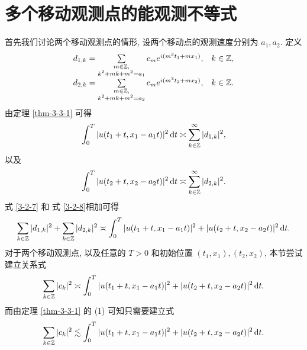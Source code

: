     \section{多个移动观测点的能观测不等式}
    首先我们讨论两个移动观测点的情形, 设两个移动点的观测速度分别为 $a_1,a_2$.
    定义
    \begin{equation*}
        \begin{array}{ll}
                        d_{1,k}=\sum\limits_{\substack{
                m\in \mathbb{Z},  \\
                k^2+mk+m^2 = a_1 }} 
             c_me^{i(m^3t_1+mx_1)}, & k\in \mathbb{Z}, \\
                        d_{2,k}=\sum\limits_{\substack{
                m\in \mathbb{Z},  \\
                k^2+mk+m^2 = a_2 }} 
             c_me^{i(m^3t_2+mx_2)}, & k\in \mathbb{Z}. 
        \end{array}
    \end{equation*}
    由定理 \ref{thm-3-3-1} 可得
\begin{equation}\label{3-2-7}
    \int_0^T |u(t_1+t,x_1-a_1t)|^2\,\mathrm{d} t\asymp \sum_{k\in\mathbb{Z}}^\infty|d_{1,k}|^2,
\end{equation}
以及
\begin{equation}\label{3-2-8}
    \int_0^T |u(t_2+t,x_2-a_2t)|^2\,\mathrm{d} t\asymp \sum_{k\in\mathbb{Z}}^\infty|d_{2,k}|^2.
\end{equation}
式 \eqref{3-2-7} 和 式 \eqref{3-2-8}相加可得
\begin{equation}\label{3-2-9}
  \sum_{k\in\mathbb{Z}}|d_{1,k}|^2+\sum_{k\in\mathbb{Z}}|d_{2,k}|^2\asymp \int_0^T |u(t_1+t,x_1-a_1t)|^2 + |u(t_2+t,x_2-a_2t)|^2\,\mathrm{d} t.
\end{equation}
对于两个移动观测点, 以及任意的 $T>0$ 和初始位置 $(t_1,x_1),(t_2,x_2)$, 本节尝试建立关系式
\begin{equation*}
    \sum_{k\in \mathbb{Z}} |c_k|^2 \asymp \int_0^T |u(t_1+t,x_1-a_1t)|^2 + |u(t_2+t,x_2-a_2t)|^2\,\mathrm{d} t.
\end{equation*}
而由定理 \ref{thm-3-3-1} 的 (1) 可知只需要建立式
\begin{equation} 
    \sum\limits_{k\in \mathbb{Z}} |c_k|^2\lesssim\int_0^T |u(t_1+t,x_1-a_1t)|^2 + |u(t_2+t,x_2-a_2t)|^2\,\mathrm{d} t.
\end{equation}

